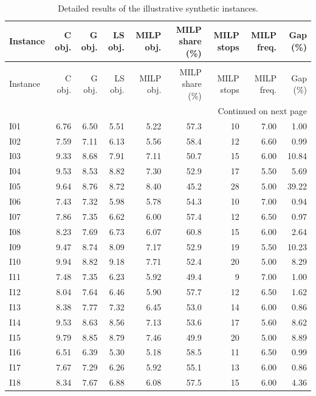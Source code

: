 \begingroup
\scriptsize
\setlength{\tabcolsep}{3.5pt}
\begin{longtable}{lrrrrrrrr}
\caption{Detailed results of the illustrative synthetic instances.} \label{tab:appendix_illustrative_results} \\
\toprule
Instance & C obj. & G obj. & LS obj. & MILP obj. & MILP share (\%) & MILP stops & MILP freq. & Gap (\%) \\
\midrule
\endfirsthead
\caption[]{Detailed results of the illustrative synthetic instances.} \\
\toprule
Instance & C obj. & G obj. & LS obj. & MILP obj. & MILP share (\%) & MILP stops & MILP freq. & Gap (\%) \\
\midrule
\endhead
\midrule
\multicolumn{9}{r}{Continued on next page} \\
\midrule
\endfoot
\bottomrule
\endlastfoot
I01 & 6.76 & 6.50 & 5.51 & 5.22 & 57.3 & 10 & 7.00 & 1.00 \\
I02 & 7.59 & 7.11 & 6.13 & 5.56 & 58.4 & 12 & 6.60 & 0.99 \\
I03 & 9.33 & 8.68 & 7.91 & 7.11 & 50.7 & 15 & 6.00 & 10.84 \\
I04 & 9.53 & 8.53 & 8.82 & 7.30 & 52.9 & 17 & 5.50 & 5.69 \\
I05 & 9.64 & 8.76 & 8.72 & 8.40 & 45.2 & 28 & 5.00 & 39.22 \\
I06 & 7.43 & 7.32 & 5.98 & 5.78 & 54.3 & 10 & 7.00 & 0.94 \\
I07 & 7.86 & 7.35 & 6.62 & 6.00 & 57.4 & 12 & 6.50 & 0.97 \\
I08 & 8.23 & 7.69 & 6.73 & 6.07 & 60.8 & 15 & 6.00 & 2.64 \\
I09 & 9.47 & 8.74 & 8.09 & 7.17 & 52.9 & 19 & 5.50 & 10.23 \\
I10 & 9.94 & 8.82 & 9.18 & 7.71 & 52.4 & 20 & 5.00 & 8.29 \\
I11 & 7.48 & 7.35 & 6.23 & 5.92 & 49.4 & 9 & 7.00 & 1.00 \\
I12 & 8.04 & 7.64 & 6.46 & 5.90 & 57.7 & 12 & 6.50 & 1.62 \\
I13 & 8.38 & 7.77 & 7.32 & 6.45 & 53.0 & 14 & 6.00 & 0.86 \\
I14 & 9.53 & 8.63 & 8.56 & 7.13 & 53.6 & 17 & 5.60 & 8.62 \\
I15 & 9.79 & 8.85 & 8.79 & 7.46 & 49.9 & 20 & 5.00 & 8.89 \\
I16 & 6.51 & 6.39 & 5.30 & 5.18 & 58.5 & 11 & 6.50 & 0.99 \\
I17 & 7.67 & 7.29 & 6.26 & 5.92 & 55.1 & 13 & 6.00 & 0.86 \\
I18 & 8.34 & 7.67 & 6.88 & 6.08 & 57.5 & 15 & 6.00 & 4.36 \\

\end{longtable}
